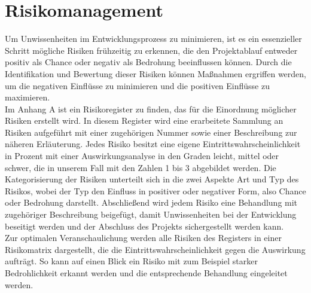 \chapter{Risikomanagement}\label{ch:risikomanagement}
Um Unwissenheiten im Entwicklungsprozess zu minimieren, ist es ein essenzieller Schritt mögliche Risiken frühzeitig 
zu erkennen, die den Projektablauf entweder positiv als Chance oder negativ als Bedrohung beeinflussen können.
Durch die Identifikation und Bewertung dieser Risiken können Maßnahmen ergriffen werden, um die negativen
Einflüsse zu minimieren und die positiven Einflüsse zu maximieren. \\
\newline
Im Anhang A ist ein Risikoregister zu finden, das für die Einordnung möglicher Risiken erstellt wird. 
In diesem Register wird eine erarbeitete Sammlung an Risiken aufgeführt mit einer zugehörigen Nummer sowie einer
Beschreibung zur näheren Erläuterung.
Jedes Risiko besitzt eine eigene Eintrittswahrscheinlichkeit in Prozent mit einer Auswirkungsanalyse in den Graden 
leicht, mittel oder schwer, die in unserem Fall mit den Zahlen 1 bis 3 abgebildet werden.
Die Kategorisierung der Risiken unterteilt sich in die zwei Aspekte Art und Typ des Risikos, wobei der Typ den Einfluss
in positiver oder negativer Form, also Chance oder Bedrohung darstellt.
Abschließend wird jedem Risiko eine Behandlung mit zugehöriger Beschreibung beigefügt, damit Unwissenheiten bei der 
Entwicklung beseitigt werden und der Abschluss des Projekts sichergestellt werden kann. \\
\newline
Zur optimalen Veranschaulichung werden alle Risiken des Registers in einer Risikomatrix dargestellt, die die
Eintrittswahrscheinlichkeit gegen die Auswirkung aufträgt.
So kann auf einen Blick ein Risiko mit zum Beispiel starker Bedrohlichkeit erkannt werden und die entsprechende 
Behandlung eingeleitet werden. \\